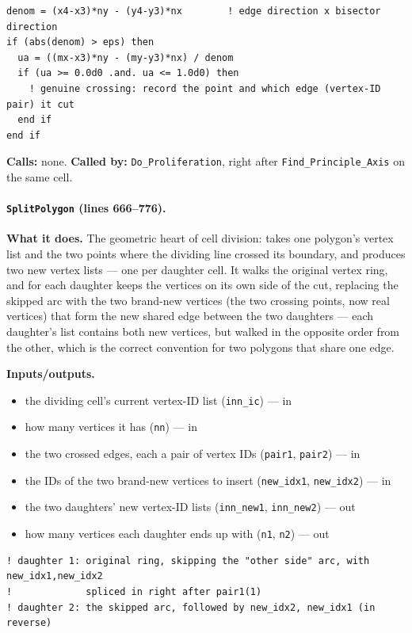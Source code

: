 \documentclass[11pt]{article}
\begin{document}
\begin{lstlisting}[caption={The line-segment crossing test used for every edge in \texttt{Find\_Bisector\_Intersections}.}]
denom = (x4-x3)*ny - (y4-y3)*nx        ! edge direction x bisector direction
if (abs(denom) > eps) then
  ua = ((mx-x3)*ny - (my-y3)*nx) / denom
  if (ua >= 0.0d0 .and. ua <= 1.0d0) then
    ! genuine crossing: record the point and which edge (vertex-ID pair) it cut
  end if
end if
\end{lstlisting}

\textbf{Calls:} none. \textbf{Called by:} \texttt{Do\_Proliferation}, right after
\texttt{Find\_Principle\_Axis} on the same cell.

\paragraph{\texttt{SplitPolygon} (lines 666--776).}
\textbf{What it does.} The geometric heart of cell division: takes one polygon's
vertex list and the two points where the dividing line crossed its boundary, and
produces two new vertex lists --- one per daughter cell. It walks the original vertex
ring, and for each daughter keeps the vertices on its own side of the cut, replacing the
skipped arc with the two brand-new vertices (the two crossing points, now real
vertices) that form the new shared edge between the two daughters --- each daughter's
list contains both new vertices, but walked in the opposite order from the other, which
is the correct convention for two polygons that share one edge.

\textbf{Inputs/outputs.}
\begin{itemize}[nosep]
  \item the dividing cell's current vertex-ID list (\texttt{inn\_ic}) --- in
  \item how many vertices it has (\texttt{nn}) --- in
  \item the two crossed edges, each a pair of vertex IDs (\texttt{pair1}, \texttt{pair2}) --- in
  \item the IDs of the two brand-new vertices to insert (\texttt{new\_idx1}, \texttt{new\_idx2}) --- in
  \item the two daughters' new vertex-ID lists (\texttt{inn\_new1}, \texttt{inn\_new2}) --- out
  \item how many vertices each daughter ends up with (\texttt{n1}, \texttt{n2}) --- out
\end{itemize}

\begin{lstlisting}[caption={The shape of \texttt{SplitPolygon}'s construction: each daughter keeps one arc of the original ring, closed off by the two new vertices.}]
! daughter 1: original ring, skipping the "other side" arc, with new_idx1,new_idx2
!             spliced in right after pair1(1)
! daughter 2: the skipped arc, followed by new_idx2, new_idx1 (in reverse)
\end{lstlisting}
\end{document}
